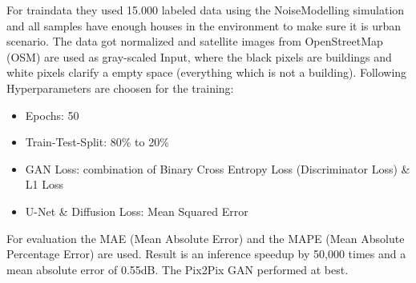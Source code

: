 			For traindata they used 15.000 labeled data using the NoiseModelling simulation and all samples have enough houses in the environment to make sure it is urban scenario. The data got normalized and satellite images from OpenStreetMap (OSM) are used as gray-scaled Input, where the black pixels are buildings and white pixels clarify a empty space (everything which is not a building). Following Hyperparameters are choosen for the training:
			\begin{itemize}
				\item Epochs: 50
				\item Train-Test-Split: 80\% to 20\%
				\item GAN Loss: combination of Binary Cross Entropy Loss (Discriminator Loss) \& L1 Loss
				\item U-Net \& Diffusion Loss: Mean Squared Error
			\end{itemize}
			
			For evaluation the MAE (Mean Absolute Error) and the MAPE (Mean Absolute Percentage Error) are used. Result is an inference speedup by 50{,}000 times and a mean absolute error of 0.55dB. The Pix2Pix GAN performed at best.
		
